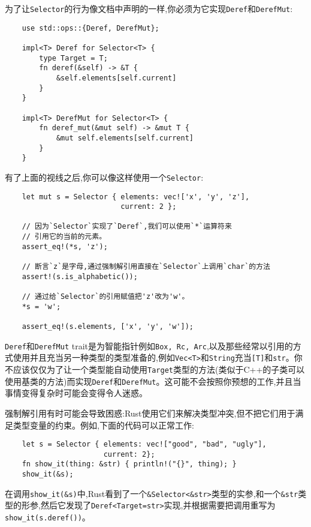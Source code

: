 为了让\texttt{Selector}的行为像文档中声明的一样,你必须为它实现\texttt{Deref}和\texttt{DerefMut}:
\begin{verbatim}
    use std::ops::{Deref, DerefMut};

    impl<T> Deref for Selector<T> {
        type Target = T;
        fn deref(&self) -> &T {
            &self.elements[self.current]
        }
    }

    impl<T> DerefMut for Selector<T> {
        fn deref_mut(&mut self) -> &mut T {
            &mut self.elements[self.current]
        }
    }
\end{verbatim}

有了上面的视线之后,你可以像这样使用一个\texttt{Selector}:
\begin{verbatim}
    let mut s = Selector { elements: vec!['x', 'y', 'z'],
                           current: 2 };

    // 因为`Selector`实现了`Deref`,我们可以使用`*`运算符来
    // 引用它的当前的元素。
    assert_eq!(*s, 'z');

    // 断言`z`是字母,通过强制解引用直接在`Selector`上调用`char`的方法
    assert!(s.is_alphabetic());

    // 通过给`Selector`的引用赋值把'z'改为'w'。
    *s = 'w';

    assert_eq!(s.elements, ['x', 'y', 'w']);
\end{verbatim}

\texttt{Deref}和\texttt{DerefMut} trait是为智能指针例如\texttt{Box, Rc, Arc},以及那些经常以引用的方式使用并且充当另一种类型的类型准备的,例如\texttt{Vec<T>}和\texttt{String}充当\texttt{[T]}和\texttt{str}。你不应该仅仅为了让一个类型能自动使用\texttt{Target}类型的方法(类似于C++的子类可以使用基类的方法)而实现\texttt{Deref}和\texttt{DerefMut}。这可能不会按照你预想的工作,并且当事情变得复杂时可能会变得令人迷惑。

强制解引用有时可能会导致困惑:Rust使用它们来解决类型冲突,但不把它们用于满足类型变量的约束。例如,下面的代码可以正常工作:
\begin{verbatim}
    let s = Selector { elements: vec!["good", "bad", "ugly"],
                       current: 2};
    fn show_it(thing: &str) { println!("{}", thing); }
    show_it(&s);
\end{verbatim}

在调用\texttt{show\_it(\&s)}中,Rust看到了一个\texttt{\&Selector<\&str>}类型的实参,和一个\texttt{\&str}类型的形参,然后它发现了\texttt{Deref<Target=str>}实现,并根据需要把调用重写为\texttt{show\_it(s.deref())}。

